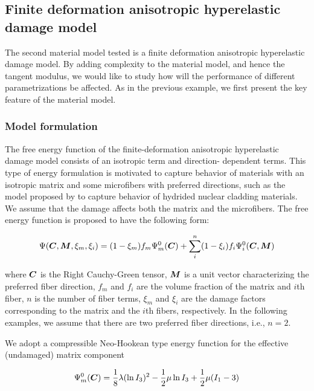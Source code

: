 \documentclass[12pt]{article}
\numberwithin{equation}{section}
\begin{document}
\subsection{Finite deformation anisotropic hyperelastic damage model}
\label{subsec:anisotropic}

The second material model tested is a finite deformation anisotropic 
hyperelastic damage model. By adding complexity to the material model, 
and hence the tangent modulus, we would like to study how will the 
performance of different parametrizations be affected. As in the 
previous example, we first present the key feature of the material 
model.

\subsubsection{Model formulation}

The free energy function of the finite-deformation anisotropic 
hyperelastic damage model consists of an isotropic term and direction-
dependent terms. This type of energy formulation is motivated to 
capture behavior of materials with an isotropic matrix and some 
microfibers with preferred directions, such as the model proposed by
\citet{Chen.etal:2014} to capture behavior of hydrided nuclear 
cladding materials. We assume that the damage affects both the matrix 
and the microfibers. The free energy function is proposed to have the 
following form:

\begin{equation}\label{eq:aniso_energy}
  \Psi ({\boldsymbol{C}}, {\boldsymbol{M}}, \xi_m, \xi_i) 
    = (1-\xi_m) f_m \Psi_m^0({\boldsymbol{C}}) 
    + \sum_{i}^{n} (1-\xi_i) f_i \Psi_i^0({\boldsymbol{C}}, {\boldsymbol{M}})
\end{equation}

where ${\boldsymbol{C}}$ is the Right Cauchy-Green tensor, ${\boldsymbol{M}}$ is a
unit vector characterizing the preferred fiber direction, $f_m$ and 
$f_i$ are the volume fraction of the matrix and $i$th fiber, $n$ is 
the number of fiber terms, $\xi_m$ and $\xi_i$ are the damage factors 
corresponding to the matrix and the $i$th fibers, respectively. In the 
following examples, we assume that there are two preferred fiber 
directions, i.e., $n=2$.

We adopt a compressible Neo-Hookean type energy function for the 
effective (undamaged) matrix component

\begin{equation}\label{eq:aniso_Psim0}
  \Psi_m^0 ({\boldsymbol{C}}) 
    = \frac{1}{8}\lambda (\ln I_3)^2
    - \frac{1}{2}\mu \ln I_3 
    + \frac{1}{2}\mu( I_1 - 3)
\end{equation}
\end{document}
